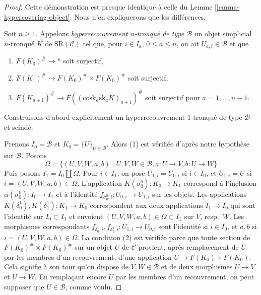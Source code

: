 \begin{proof}
Cette démonstration est presque identique à celle du
Lemme \ref{lemma-hypercovering-object}. Nous n'en
expliquerons que les différences.

\medskip\noindent
Soit $n \geq 1$. Appelons
{\it hyperrecouvrement $n$-tronqué de type $\mathcal{B}$}
un objet simplicial
$n$-tronqué $K$ de $\text{SR}(\mathcal{C})$
tel que, pour $i \in I_a$, $0 \leq a \leq n$,
on ait $U_{a, i} \in \mathcal{B}$ et que
\begin{enumerate}
\item $F(K_0)^\# \to *$ soit surjectif,
\item $F(K_1)^\# \to F(K_0)^\# \times F(K_0)^\#$ soit surjectif,
\item $F(K_{a + 1})^\# \to F((\text{cosk}_a \text{sk}_a K)_{a + 1})^\#$
soit surjectif pour $a = 1, \ldots, n - 1$.
\end{enumerate}
Construisons d'abord explicitement un hyperrecouvrement $1$-tronqué de type $\mathcal{B}$ et scindé.

\medskip\noindent
Prenons $I_0 = \mathcal{B}$ et $K_0 = \{U\}_{U \in \mathcal{B}}$.
Alors (1) est vérifiée d'après notre hypothèse sur $\mathcal{B}$. Posons
$$
\Omega =
\{(U, V, W, a, b) \mid U, V, W \in \mathcal{B}, a : U \to V, b : U \to W\}
$$
Puis posons $I_1 = I_0 \amalg \Omega$. Pour $i \in I_1$, on pose
$U_{1, i} = U_{0, i}$ si $i \in I_0$, et $U_{1, i} = U$
si $i = (U, V, W, a, b) \in \Omega$. L'application
$K(\sigma^0_0) : K_0 \to K_1$ correspond à
l'inclusion $\alpha(\sigma^0_0) : I_0 \to I_1$
et à l'identité $f_{\sigma^0_0, i} : U_{0, i} \to U_{1, i}$
sur les objets. Les applications $K(\delta^1_0), K(\delta^1_1) : K_1 \to K_0$
correspondent aux deux applications $I_1 \to I_0$ qui sont
l'identité sur $I_0 \subset I_1$ et envoient $(U, V, W, a, b) \in \Omega \subset I_1$
sur $V$, resp.\ $W$. Les morphismes correspondants
$f_{\delta^1_0, i}, f_{\delta^1_1, i} : U_{1, i} \to U_{0, i}$ sont
l'identité si $i \in I_0$, et $a, b$ si $i = (U, V, W, a, b) \in \Omega$.
La condition (2) est vérifiée parce que toute section de
$F(K_0)^\# \times F(K_0)^\#$ sur un objet $U$ de $\mathcal{C}$
provient, après remplacement de $U$ par les membres d'un recouvrement,
d'une application $U \to F(K_0) \times F(K_0)$.
Cela signifie à son tour qu'on dispose de $V, W \in \mathcal{B}$
et de deux morphismes $U \to V$ et $U \to W$. En remplaçant encore
$U$ par les membres d'un recouvrement, on peut supposer que $U \in \mathcal{B}$,
comme voulu.


\end{proof}
